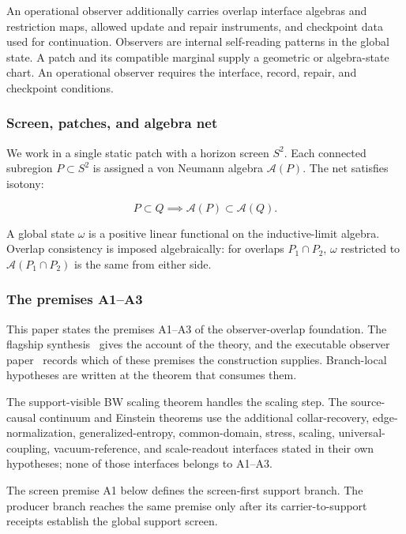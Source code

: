 An operational observer additionally carries overlap interface algebras and restriction maps,
allowed update and repair instruments, and checkpoint data used for continuation. Observers are
internal self-reading patterns in the global state. A patch and its compatible marginal supply a
geometric or algebra-state chart. An operational observer requires the interface, record, repair,
and checkpoint conditions.

\subsubsection{Screen, patches, and algebra net}\label{12-screen-patches-and-algebra-net}

We work in a single static patch with a horizon screen \(S^2\). Each connected subregion \(P \subset S^2\) is assigned a von Neumann algebra \(\mathcal{A}(P)\). The net satisfies isotony:

\[
P \subset Q \implies \mathcal{A}(P) \subset \mathcal{A}(Q).
\]

A global state \(\omega\) is a positive linear functional on the inductive-limit algebra. Overlap consistency is imposed algebraically: for overlaps \(P_1 \cap P_2\), \(\omega\) restricted to \(\mathcal{A}(P_1 \cap P_2)\) is the same from either side.

\subsubsection{The premises A1--A3}\label{13-premises}

This paper states the premises A1--A3 of the observer-overlap foundation. The flagship synthesis~\cite{ophflagship} gives the account of the theory, and the executable observer paper~\cite{ophmodel} records which of these premises the construction supplies. Branch-local hypotheses are written at the theorem that consumes
them.

The support-visible BW scaling theorem handles the scaling step. The source-causal continuum and Einstein
theorems use the additional collar-recovery, edge-normalization, generalized-entropy,
common-domain, stress, scaling, universal-coupling, vacuum-reference, and scale-readout
interfaces stated in their own hypotheses; none of those interfaces belongs to A1--A3.

The screen premise A1 below defines the screen-first support branch. The producer branch reaches the
same premise only after its carrier-to-support receipts establish the global support screen.

